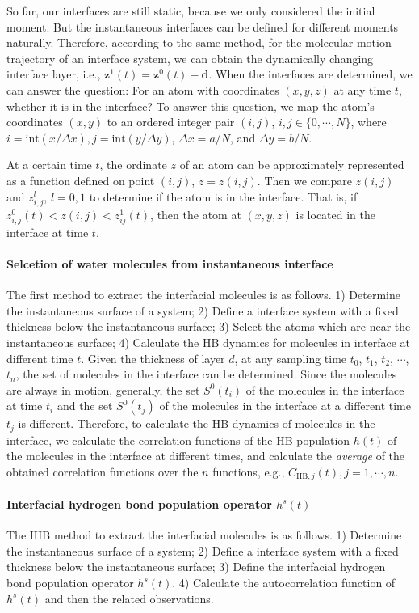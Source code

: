 So far, our interfaces are still static, because we only considered the initial moment. 
But the instantaneous interfaces can be defined for different moments naturally. 
Therefore, according to the same method, for the molecular motion trajectory of an interface system, 
we can obtain the dynamically changing interface layer, i.e., ${\mathbf z}^1(t)={\mathbf z}^0(t)-{\mathbf d}$. 
When the interfaces are determined, we can answer the question: For an atom with coordinates $(x, y, z)$ at any time $t$, whether it is in the interface?
To answer this question, we map the atom's coordinates $(x, y)$ to an ordered integer pair $(i, j)$, $i,j \in  \{0,\cdots,N\}$, 
where $i = \text{int}(x /\Delta x), j = \text{int}(y/\Delta y)$, $\Delta x = a/N$, and $\Delta y = b/N$.
 
At a certain time $t$, the ordinate $z$ of an atom can be approximately represented as a function defined on point $(i, j)$, $z=z(i,j)$. 
Then we compare $z(i,j)$ and $z^l_{i,j}$, $l=0,1$ to determine if the atom is in the interface. 
That is, if $z^0_{i,j}(t)<z(i,j)<z^1_{ij}(t)$, then the atom at $(x,y,z)$ is located in the interface at time $t$.

\paragraph{Selcetion of water molecules from instantaneous interface}
The first method to extract the interfacial molecules is as follows. 
1) Determine the instantaneous surface of a system;
2) Define a interface system with a fixed thickness below the instantaneous surface; 
3) Select the atoms which are near the instantaneous surface;
4) Calculate the HB dynamics for molecules in interface at different time $t$.
Given the thickness of layer $d$, at any sampling time $t_0$, $t_1$, $t_2$, $\cdots$, $t_n$, the set of molecules in the interface can be determined. 
Since the molecules are always in motion, generally, the set $S^0(t_i)$ of the molecules in the interface at time $t_i$ 
and the set $S^0(t_j)$ of the molecules in the interface at a different time $t_j$ is different. 
Therefore, to calculate the HB dynamics of molecules in the interface, we calculate the correlation functions of 
the HB population $h(t)$ of the molecules in the interface at different times, 
and calculate the \emph{average} of the obtained correlation functions 
over the $n$ functions, e.g., $C_{\text{HB},j}(t), j=1,\cdots,n$.
 
\paragraph{Interfacial hydrogen bond population operator $h^s(t)$}
The IHB method to extract the interfacial molecules is as follows. 
1) Determine the instantaneous surface of a system;
2) Define a interface system with a fixed thickness below the instantaneous surface; 
3) Define the interfacial hydrogen bond population operator $h^s(t)$.
4) Calculate the autocorrelation function of $h^s(t)$ and then the related observations. 

